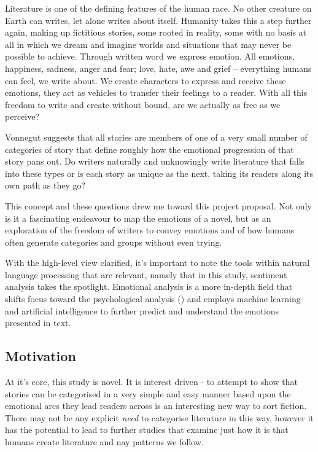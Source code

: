 \documentclass{article}
\begin{document}
        Literature is one of the defining features of the human race. No other creature on Earth can writes, let alone writes about itself. Humanity takes this a step further again, making up fictitious stories, some rooted in reality, some with no basis at all in which we dream and imagine worlds and situations that may never be possible to achieve. Through written word we express emotion. All emotions, happiness, sadness, anger and fear; love, hate, awe and grief – everything humans can feel, we write about. We create characters to express and receive these emotions, they act as vehicles to transfer their feelings to a reader. With all this freedom to write and create without bound, are we actually as free as we perceive?

        Vonnegut suggests that all stories are members of one of a very small number of categories of story that define roughly how the emotional progression of that story pans out. Do writers naturally and unknowingly write literature that falls into these types or is each story as unique as the next, taking its readers along its own path as they go?

        This concept and these questions drew me toward this project proposal. Not only is it a fascinating endeavour to map the emotions of a novel, but as an exploration of the freedom of writers to convey emotions and of how humans often generate categories and groups without even trying.

        With the high-level view clarified, it's important to note the tools within natural language processing that are relevant, namely that in this study, sentiment analysis takes the spotlight. Emotional analysis is a more in-depth field that shifts focus toward the psychological analysis (\cite{sentimentVsEmotionAnalysis}) and employs machine learning and artificial intelligence to further predict and understand the emotions presented in text.
    \subsection{Motivation}
        At it's core, this study is novel. It is interest driven - to attempt to show that stories can be categorised in a very simple and easy manner based upon the emotional arcs they lead readers across is an interesting new way to sort fiction. There may not be any explicit \textit{need} to categorise literature in this way, however it has the potential to lead to further studies that examine just how it is that humans create literature and nay patterns we follow.
\end{document}
